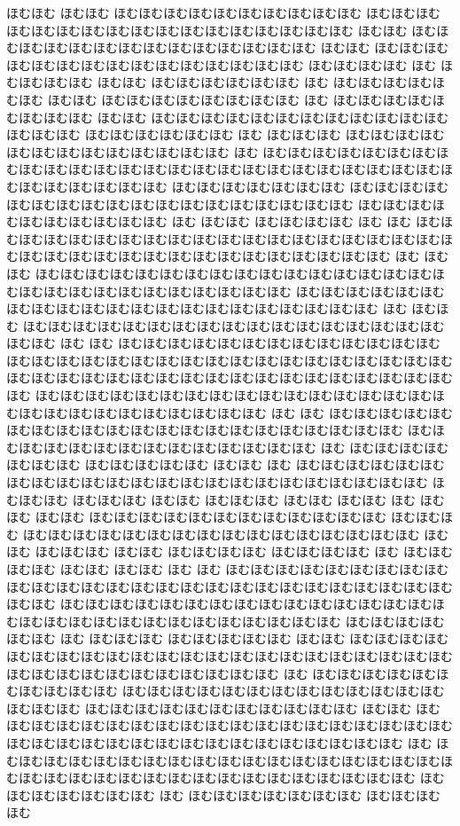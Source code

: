 \documentclass[a4paper]{article}
\begin{document}
\begin{prochomuhomu}{\NabeAzz}
ほむほむ ほむほむ ほむほむほむほむほむほむほむほむほむほむ ほむほむほむ ほむほむほむほむほむほむほむほむほむほむほむほむほむほむ ほむほむ ほむほむほむほむほむほむほむほむほむほむほむほむほむほむ ほむほむ ほむほむほむほむほむほむほむほむほむほむほむほむほむほむほむ ほむほむほむほむ ほむ ほむほむほむほむ ほむほむ ほむほむほむほむほむほむ ほむ ほむほむほむほむほむほむ ほむほむ ほむほむほむほむほむほむほむほむ ほむ ほむほむほむほむほむほむほむほむ ほむほむ ほむほむほむほむほむほむほむほむほむほむほむほむほむほむほむ ほむほむほむほむほむほむ ほむ ほむほむほむ ほむほむほむほむほむほむほむほむほむほむほむほむほむ ほむ ほむほむほむほむほむほむほむほむほむほむほむほむほむほむほむほむほむほむほむほむほむほむほむほむほむほむほむほむほむほむほむほむ ほむほむほむほむほむほむほむ ほむほむほむほむほむほむほむほむほむほむほむほむほむほむほむほむほむほむ ほむほむほむほむほむほむほむほむほむほむ ほむ ほむほむ ほむほむほむほむ ほむ ほむ ほむほむほむほむほむほむほむほむほむほむほむほむほむほむほむほむほむほむほむほむほむほむほむほむほむほむほむほむほむほむほむほむほむほむほむ ほむ ほむほむ ほむほむほむほむほむほむほむほむほむほむほむほむほむほむほむほむほむほむほむほむほむほむほむほむほむほむほむほむ ほむほむほむほむほむほむほむほむほむほむほむほむほむほむほむほむほむほむほむほむほむ ほむ ほむほむ ほむほむほむほむほむほむほむほむほむほむほむほむほむほむほむほむほむほむほむ ほむ ほむ ほむほむほむほむほむほむほむほむほむほむほむほむほむ ほむほむほむほむほむほむほむほむほむほむほむほむほむほむほむほむほむほむほむほむほむほむほむほむほむほむほむほむほむほむほむほむほむほむほむほむ ほむ ほむほむほむほむほむほむほむほむほむほむほむほむほむほむほむほむほむほむほむほむほむほむほむほむほむほむほむ ほむ ほむ ほむほむほむほむほむほむほむほむほむほむほむほむほむほむほむほむほむほむほむほむほむ ほむほむほむほむほむほむほむほむほむほむほむほむほむほむ ほむ ほむほむほむほむほむほむほむ ほむほむほむほむほむ ほむほむ ほむ ほむほむほむほむほむほむ ほむほむほむほむほむほむほむほむほむほむほむほむほむほむほむほむほむ
ほむほむほむ ほむほむほむ ほむほむ ほむほむほむ ほむほむ ほむほむ ほむ
ほむほむ ほむほむ ほむほむほむほむほむほむほむほむほむほむほむほむ ほむほむほむ ほむほむほむほむほむほむほむほむほむほむほむほむほむほむほむほむ ほむほむ ほむほむほむ ほむほむ ほむほむほむほむ ほむほむほむほむ ほむ ほむほむほむほむ ほむほむ ほむほむ ほむ ほむ ほむほむほむほむほむほむほむほむほむほむほむほむほむほむほむほむほむほむほむほむほむほむほむほむほむほむほむほむほむ ほむほむほむほむほむほむほむほむほむほむほむほむほむほむほむほむほむほむほむほむほむほむほむほむほむほむほむほむほむ ほむほむほむほむ ほむほむ ほむ ほむほむほむ ほむほむほむほむほむ ほむほむ ほむほむほむほむほむほむほむほむほむほむほむほむほむほむほむほむほむほむほむほむほむほむほむほむほむほむほむほむほむほむほむほむほむ ほむ ほむほむほむほむほむほむほむほむほむほむ ほむほむほむほむほむほむほむほむほむほむほむほむほむほむほむほむ ほむほむほむほむほむほむほむほむほむほむほむ ほむほむ ほむ ほむほむほむほむほむほむほむほむほむほむほむほむほむほむほむほむほむほむほむほむほむほむほむほむほむほむほむほむほむほむほむほむほむほむ ほむ ほむほむほむほむほむほむほむほむほむほむほむほむほむほむほむほむほむほむほむほむほむほむほむほむほむほむほむほむほむほむほむほむほむほむほむ ほむほむほむほむほむほむほむ ほむ ほむほむほむほむほむほむほむ ほむほむほむ ほむ

\end{prochomuhomu}
\end{document}
